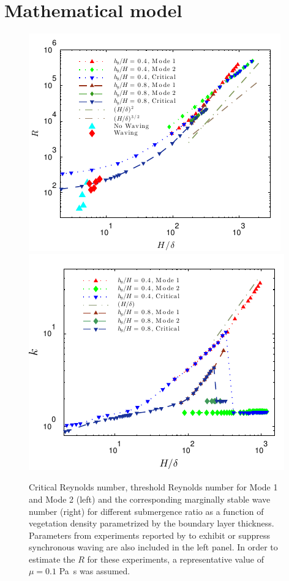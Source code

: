 \documentclass{jfm}
\renewcommand{\Rey}{{R}}
\begin{document}
\section{Mathematical model}
\begin{figure}
\begin{center}
\includegraphics[scale = 0.95]{new_graph_R_vs_delta}\includegraphics[scale = 0.95]{new_graph_K_vs_delta}
\end{center}
\caption{
Critical Reynolds number, threshold Reynolds number for Mode 1 and Mode 2 (left) and the corresponding marginally stable wave number (right) for different submergence ratio as a function of vegetation density parametrized by the boundary layer thickness. 
Parameters from experiments reported by \cite{Ghisal02} to exhibit or suppress synchronous waving are also included in the left panel. 
In order to estimate the $\Rey$ for these experiments, a representative value of $\mu=0.1$ Pa~s was assumed.
}
\label{Re_vs_delta}
\end{figure}
\end{document}
